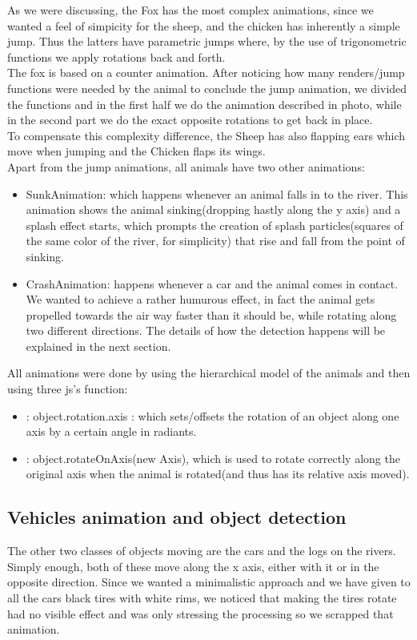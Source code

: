 \documentclass[a4paper, 11pt]{article}
\begin{document}
As we were discussing, the Fox has the most complex animations, since we wanted a feel of simpicity for the sheep, and the chicken has inherently a simple jump. Thus the latters have parametric jumps where, by the use of trigonometric functions we apply rotations back and forth.\\
The fox is based on a counter animation. After noticing how many renders/jump functions were needed by the animal to conclude the jump animation, we divided the functions and in the first half we do the animation described in photo, while in the second part we do the exact opposite rotations to get back in place.\\
To compensate this complexity difference, the Sheep has also flapping ears which move when jumping and the Chicken flaps its wings.\\
Apart from the jump animations, all animals have two other animations:
\begin{itemize}
\item SunkAnimation: which happens whenever an animal falls in to the river. This animation shows the animal sinking(dropping hastly along the y axis) and a splash effect starts, which prompts the creation of splash particles(squares of the same color of the river, for simplicity) that rise and fall from the point of sinking.
\item CrashAnimation: happens whenever a car and the animal comes in contact. We wanted to achieve a rather humurous effect, in fact the animal gets propelled towards the air way faster than it should be, while rotating along two different directions. The details of how the detection happens will be explained in the next section.
\end{itemize}
All animations were done by using the hierarchical model of the animals and then using three js's function:
\begin{itemize}
\item : object.rotation.axis : which sets/offsets the rotation of an object along one axis  by a certain angle in radiants.
\item: object.rotateOnAxis(new Axis), which is used to rotate correctly along the original axis when the animal is rotated(and thus has its relative axis moved).
\end{itemize}

\subsection{Vehicles animation and object detection}
The other two classes of objects moving are the cars and the logs on the rivers.\\
Simply enough, both of these move along the x axis, either with it or in the opposite direction. Since we wanted a minimalistic approach and we have given to all the cars black tires with white rims, we noticed that making the tires rotate had no visible effect and was only stressing the  processing so we scrapped that animation.\\
\end{document}
